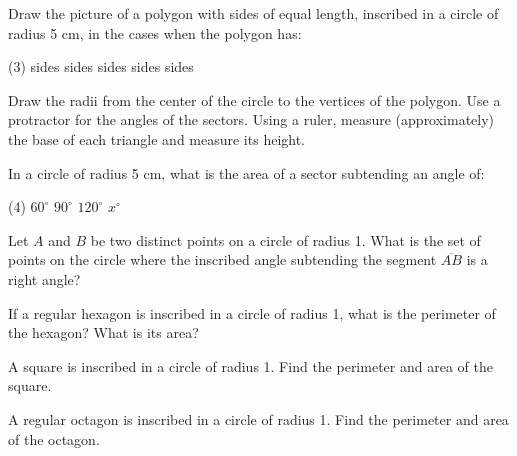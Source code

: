 \documentclass[12pt]{book} %
\begin{document}
\setcounter{Exercise}{0}
\begin{ExerciseList}
\Exercise Draw the picture of a polygon with sides of equal length, inscribed in a circle of radius 5 cm, in the cases when the polygon has:
\begin{tasks}(3)
 sides
 sides
 sides
 sides
 sides
\end{tasks}
Draw the radii from the center of the circle to the vertices of the polygon. Use a protractor for the angles of the sectors. Using a ruler, measure (approximately) the base of each triangle and measure its height.

\Exercise In a circle of radius 5 cm, what is the area of a sector subtending an angle of:
\begin{tasks}(4)
\task[(a)] $60^\circ$
\task[(b)] $90^\circ$
\task[(c)] $120^\circ$
\task[(d)] $x^\circ$
\end{tasks}

\Exercise Let $A$ and $B$ be two distinct points on a circle of radius 1. What is the set of points on the circle where the inscribed angle subtending the segment $\overline{AB}$ is a right angle?

\Exercise If a regular hexagon is inscribed in a circle of radius 1, what is the perimeter of the hexagon? What is its area?

\Exercise A square is inscribed in a circle of radius 1. Find the perimeter and area of the square.

\Exercise A regular octagon is inscribed in a circle of radius 1. Find the perimeter and area of the octagon.
\end{ExerciseList}
\end{document}
